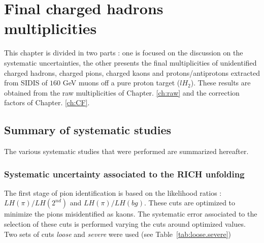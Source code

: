 
\chapter{Final charged hadrons multiplicities} %

\label{ch:mult} %


This chapter is divided in two parts : one is focused on the discussion on the systematic uncertainties, the other presents the final multiplicities of unidentified charged hadrons, charged pions, charged kaons and protons/antiprotons extracted from SIDIS of $160$ GeV muons off a pure proton target ($lH_2$). These results are obtained from the raw multiplicities of Chapter. \ref{ch:raw} and the correction factors of Chapter. \ref{ch:CF}.


\section{Summary of systematic studies}

The various systematic studies that were performed are summarized hereafter.


\subsection{Systematic uncertainty associated to the RICH unfolding}

The first stage of pion identification is based on the likelihood ratios : $LH(\pi)/LH(2^{nd})$ and $LH(\pi)/LH(bg)$. These cuts are optimized to minimize the
pions misidentified as kaons. The systematic error associated to the selection of these cuts is performed varying the cuts around optimized values. Two sets of
cuts \textit{loose} and \textit{severe} were used (see Table~\ref{tab:loose.severe})

